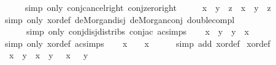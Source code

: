 \begin{isabellebody}
\ \ \ \ \isamarkupfalse%
\ {\isacharparenleft}{\kern0pt}simp\ only{\isacharcolon}{\kern0pt}\ conj{\isacharunderscore}{\kern0pt}cancel{\isacharunderscore}{\kern0pt}right\ conj{\isacharunderscore}{\kern0pt}zero{\isacharunderscore}{\kern0pt}right{\isacharparenright}{\kern0pt}\isanewline
\ \ \isamarkupfalse%
\ \isamarkupfalse%
\ {\isachardoublequoteopen}{\isacharparenleft}{\kern0pt}x\ \isactrlbold {\isasymominus}\ y{\isacharparenright}{\kern0pt}\ \isactrlbold {\isasymominus}\ z\ {\isacharequal}{\kern0pt}\ x\ \isactrlbold {\isasymominus}\ {\isacharparenleft}{\kern0pt}y\ \isactrlbold {\isasymominus}\ z{\isacharparenright}{\kern0pt}{\isachardoublequoteclose}\isanewline
\ \ \ \ \isamarkupfalse%
\ {\isacharparenleft}{\kern0pt}simp\ only{\isacharcolon}{\kern0pt}\ xor{\isacharunderscore}{\kern0pt}def\ de{\isacharunderscore}{\kern0pt}Morgan{\isacharunderscore}{\kern0pt}disj\ de{\isacharunderscore}{\kern0pt}Morgan{\isacharunderscore}{\kern0pt}conj\ double{\isacharunderscore}{\kern0pt}compl{\isacharparenright}{\kern0pt}\isanewline
\ \ \ \ \ \ {\isacharparenleft}{\kern0pt}simp\ only{\isacharcolon}{\kern0pt}\ conj{\isacharunderscore}{\kern0pt}disj{\isacharunderscore}{\kern0pt}distribs\ conj{\isacharunderscore}{\kern0pt}ac\ ac{\isacharunderscore}{\kern0pt}simps{\isacharparenright}{\kern0pt}\isanewline
\ \ \isamarkupfalse%
\ {\isachardoublequoteopen}x\ \isactrlbold {\isasymominus}\ y\ {\isacharequal}{\kern0pt}\ y\ \isactrlbold {\isasymominus}\ x{\isachardoublequoteclose}\isanewline
\ \ \ \ \isamarkupfalse%
\ {\isacharparenleft}{\kern0pt}simp\ only{\isacharcolon}{\kern0pt}\ xor{\isacharunderscore}{\kern0pt}def\ ac{\isacharunderscore}{\kern0pt}simps{\isacharparenright}{\kern0pt}\isanewline
\ \ \isamarkupfalse%
\ {\isachardoublequoteopen}x\ \isactrlbold {\isasymominus}\ \ {\isacharequal}{\kern0pt}\ x{\isachardoublequoteclose}\isanewline
\ \ \ \ \isamarkupfalse%
\ {\isacharparenleft}{\kern0pt}simp\ add{\isacharcolon}{\kern0pt}\ xor{\isacharunderscore}{\kern0pt}def{\isacharparenright}{\kern0pt}\isanewline
{}\isamarkupfalse%
%
\endisatagproof
{\isafoldproof}%
%
\isadelimproof
\isanewline
%
\endisadelimproof
\isanewline
{}\isamarkupfalse%
\ xor{\isacharunderscore}{\kern0pt}def{}{\isacharcolon}{\kern0pt}\isanewline
\ \ {\isacartoucheopen}x\ \isactrlbold {\isasymominus}\ y\ {\isacharequal}{\kern0pt}\ {\isacharparenleft}{\kern0pt}x\ \isactrlbold {\isasymsqunion}\ y{\isacharparenright}{\kern0pt}\ \isactrlbold {\isasymsqinter}\ {\isacharparenleft}{\kern0pt}\isactrlbold {\isacharminus}{\kern0pt}\ x\ \isactrlbold {\isasymsqunion}\ \isactrlbold {\isacharminus}{\kern0pt}\ y{\isacharparenright}{\kern0pt}{\isacartoucheclose}\isanewline

\end{isabellebody}
